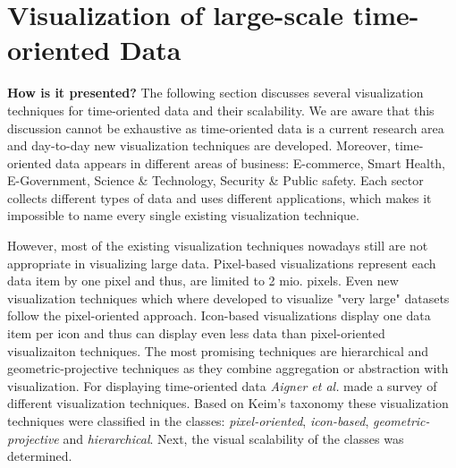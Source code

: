 \section{Visualization of large-scale time-oriented Data} \label{vis}
\textbf{How is it presented?}
The following section discusses several visualization techniques for time-oriented data and their scalability. We are aware that this discussion cannot be exhaustive as time-oriented data is a current research area and day-to-day new visualization techniques are developed.
Moreover, time-oriented data appears in different areas of business: E-commerce, Smart Health, E-Government, Science \& Technology, Security \& Public safety. Each sector collects different types of data and uses different applications, which makes it impossible to name every single existing visualization technique.

However, most of the existing visualization techniques nowadays still are not appropriate in visualizing large data. Pixel-based visualizations represent each data item by one pixel and thus, are limited to 2 mio. pixels. Even new visualization techniques which where developed to visualize "very large" datasets follow the pixel-oriented approach\cite{Keim1995, Keim1996}. Icon-based visualizations display one data item per icon and thus can display even less data than pixel-oriented visualizaiton techniques. The most promising techniques are hierarchical and geometric-projective techniques as they combine aggregation or abstraction with visualization. 
For displaying time-oriented data \textit{Aigner et al.} made a survey of different visualization techniques. Based on Keim's taxonomy\cite{Keim1995} these visualization techniques were classified in the classes: \textit{pixel-oriented}, \textit{icon-based}, \textit{geometric-projective} and \textit{hierarchical}. Next, the visual scalability of the classes was determined. 

